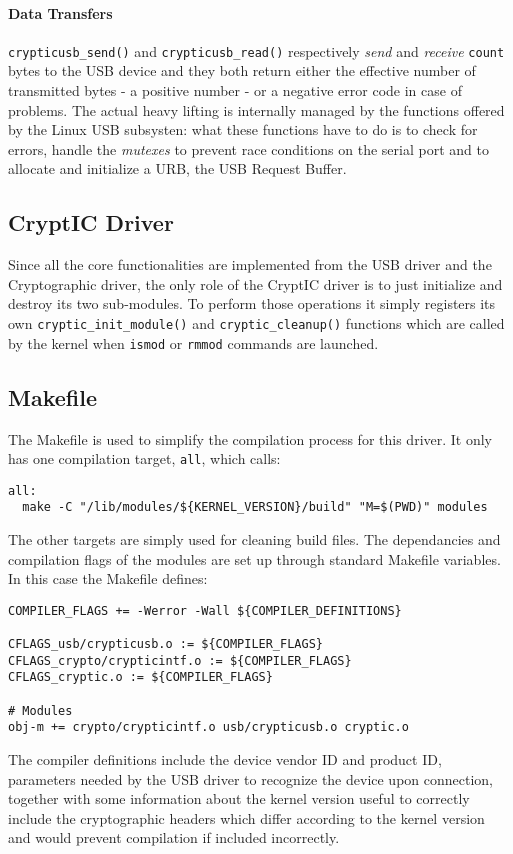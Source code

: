 \paragraph{Data Transfers} \texttt{crypticusb\_send()} and \texttt{crypticusb\_read()} respectively \emph{send} and \emph{receive} \texttt{count} bytes to the USB device and they both return either the effective number of transmitted bytes - a positive number - or a negative error code in case of problems. The actual heavy lifting is internally managed by the functions offered by the Linux USB subsysten: what these functions have to do is to check for errors, handle the \textit{mutexes} to prevent race conditions on the serial port and to allocate and initialize a URB, the USB Request Buffer.

\subsection{CryptIC Driver}
Since all the core functionalities are implemented from the USB driver and the Cryptographic driver, the only role of the CryptIC driver is to just initialize and destroy its two sub-modules. To perform those operations it simply registers its own \texttt{cryptic\_init\_module()} and \texttt{cryptic\_cleanup()} functions which are called by the kernel when \texttt{ismod} or \texttt{rmmod} commands are launched.

\subsection{Makefile}
The Makefile is used to simplify the compilation process for this driver. It only has one compilation target, \texttt{all}, which calls:
\begin{lstlisting}
all:
  make -C "/lib/modules/${KERNEL_VERSION}/build" "M=$(PWD)" modules
\end{lstlisting}
The other targets are simply used for cleaning build files. The dependancies and compilation flags of the modules are set up through standard Makefile variables. In this case the Makefile defines:
\begin{lstlisting}
COMPILER_FLAGS += -Werror -Wall ${COMPILER_DEFINITIONS}

CFLAGS_usb/crypticusb.o := ${COMPILER_FLAGS}
CFLAGS_crypto/crypticintf.o := ${COMPILER_FLAGS}
CFLAGS_cryptic.o := ${COMPILER_FLAGS}

# Modules
obj-m += crypto/crypticintf.o usb/crypticusb.o cryptic.o
\end{lstlisting}
The compiler definitions include the device vendor ID and product ID, parameters needed by the USB driver to recognize the device upon connection, together with some information about the kernel version useful to correctly include the cryptographic headers which differ according to the kernel version and would prevent compilation if included incorrectly.

